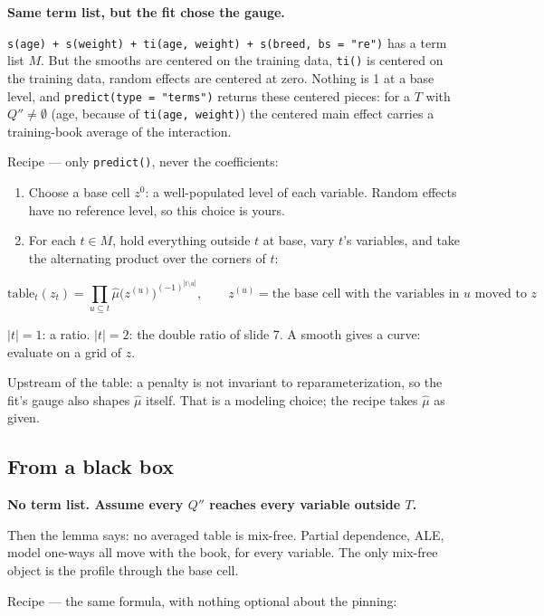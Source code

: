 \documentclass[
  letterpaper,
  DIV=11,
  numbers=noendperiod]{scrartcl}
\providecommand{\tightlist}{%
  \setlength{\itemsep}{0pt}\setlength{\parskip}{0pt}}
\begin{document}
\textbf{Same term list, but the fit chose the gauge.}

\texttt{s(age)\ +\ s(weight)\ +\ ti(age,\ weight)\ +\ s(breed,\ bs\ =\ "re")}
has a term list \(M\). But the smooths are centered on the training
data, \texttt{ti()} is centered on the training data, random effects are
centered at zero. Nothing is 1 at a base level, and
\texttt{predict(type\ =\ "terms")} returns these centered pieces: for a
\(T\) with \(Q'' \neq \emptyset\) (age, because of
\texttt{ti(age,\ weight)}) the centered main effect carries a
training-book average of the interaction.

Recipe --- only \texttt{predict()}, never the coefficients:

\begin{enumerate}
\def\labelenumi{\arabic{enumi}.}
\tightlist
\item
  Choose a base cell \(z^0\): a well-populated level of each variable.
  Random effects have no reference level, so this choice is yours.
\item
  For each \(t \in M\), hold everything outside \(t\) at base, vary
  \(t\)'s variables, and take the alternating product over the corners
  of \(t\):
\end{enumerate}

\[
\text{table}_t(z_t) = \prod_{u \subseteq t} \hat{\mu}\big(z^{(u)}\big)^{(-1)^{|t \setminus u|}},
\qquad z^{(u)} = \text{the base cell with the variables in } u \text{ moved to } z
\]

\(|t| = 1\): a ratio. \(|t| = 2\): the double ratio of slide 7. A smooth
gives a curve: evaluate on a grid of \(z\).

Upstream of the table: a penalty is not invariant to reparameterization,
so the fit's gauge also shapes \(\hat{\mu}\) itself. That is a modeling
choice; the recipe takes \(\hat{\mu}\) as given.

\subsection{From a black box}\label{from-a-black-box}

\textbf{No term list. Assume every \(Q''\) reaches every variable
outside \(T\).}

Then the lemma says: no averaged table is mix-free. Partial dependence,
ALE, model one-ways all move with the book, for every variable. The only
mix-free object is the profile through the base cell.

Recipe --- the same formula, with nothing optional about the pinning:
\end{document}
